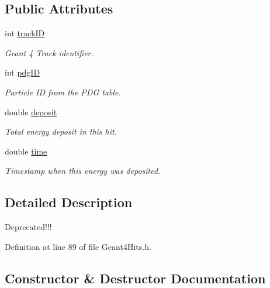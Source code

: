 \subsection*{Public Attributes}
\begin{DoxyCompactItemize}
\item 
int \hyperlink{struct_d_d4hep_1_1_simulation_1_1_geant4_hit_1_1_monte_carlo_contrib_a9dff0f94a376999512fc5d80ac2e2309}{track\+ID}
\begin{DoxyCompactList}\small\item\em Geant 4 Track identifier. \end{DoxyCompactList}\item 
int \hyperlink{struct_d_d4hep_1_1_simulation_1_1_geant4_hit_1_1_monte_carlo_contrib_aa0b40f39fd3df147934c6a2d609e72c1}{pdg\+ID}
\begin{DoxyCompactList}\small\item\em Particle ID from the P\+DG table. \end{DoxyCompactList}\item 
double \hyperlink{struct_d_d4hep_1_1_simulation_1_1_geant4_hit_1_1_monte_carlo_contrib_a3bbe67139ddec239f5dc33ace2986bb1}{deposit}
\begin{DoxyCompactList}\small\item\em Total energy deposit in this hit. \end{DoxyCompactList}\item 
double \hyperlink{struct_d_d4hep_1_1_simulation_1_1_geant4_hit_1_1_monte_carlo_contrib_aa843f5069ad2f9e03d085bda49e9b658}{time}
\begin{DoxyCompactList}\small\item\em Timestamp when this energy was deposited. \end{DoxyCompactList}\end{DoxyCompactItemize}


\subsection{Detailed Description}
Deprecated!!! 

Definition at line 89 of file Geant4\+Hits.\+h.



\subsection{Constructor \& Destructor Documentation}
\hypertarget{struct_d_d4hep_1_1_simulation_1_1_geant4_hit_1_1_monte_carlo_contrib_ade0fa203d957c85105826a23916ead5e}{}\label{struct_d_d4hep_1_1_simulation_1_1_geant4_hit_1_1_monte_carlo_contrib_ade0fa203d957c85105826a23916ead5e} 
